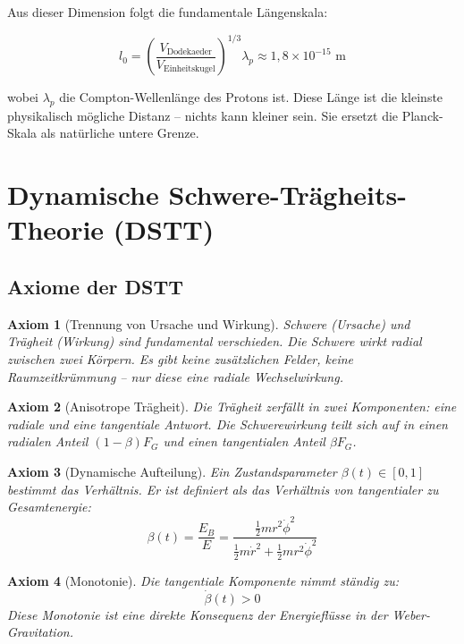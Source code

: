 \documentclass[12pt,a4paper]{article}
\newtheorem{axiom}{Axiom}[section]
\begin{document}
Aus dieser Dimension folgt die fundamentale Längenskala:

\begin{equation}
l_0 = \left( \frac{V_{\text{Dodekaeder}}}{V_{\text{Einheitskugel}}} \right)^{1/3} \lambda_p \approx 1,8 \times 10^{-15} \text{ m}
\end{equation}

wobei $\lambda_p$ die Compton-Wellenlänge des Protons ist. Diese Länge ist die kleinste physikalisch mögliche Distanz -- nichts kann kleiner sein. Sie ersetzt die Planck-Skala als natürliche untere Grenze.

\section{Dynamische Schwere-Trägheits-Theorie (DSTT)}

\subsection{Axiome der DSTT}

\begin{axiom}[Trennung von Ursache und Wirkung]
Schwere (Ursache) und Trägheit (Wirkung) sind fundamental verschieden. Die Schwere wirkt radial zwischen zwei Körpern. Es gibt keine zusätzlichen Felder, keine Raumzeitkrümmung -- nur diese eine radiale Wechselwirkung.
\end{axiom}

\begin{axiom}[Anisotrope Trägheit]
Die Trägheit zerfällt in zwei Komponenten: eine radiale und eine tangentiale Antwort. Die Schwerewirkung teilt sich auf in einen radialen Anteil $(1-\beta)F_G$ und einen tangentialen Anteil $\beta F_G$.
\end{axiom}

\begin{axiom}[Dynamische Aufteilung]
Ein Zustandsparameter $\beta(t) \in [0,1]$ bestimmt das Verhältnis. Er ist definiert als das Verhältnis von tangentialer zu Gesamtenergie:
\begin{equation}
\beta(t) = \frac{E_B}{E} = \frac{\frac{1}{2}mr^2\dot{\phi}^2}{\frac{1}{2}m\dot{r}^2 + \frac{1}{2}mr^2\dot{\phi}^2}
\end{equation}
\end{axiom}

\begin{axiom}[Monotonie]
Die tangentiale Komponente nimmt ständig zu:
\begin{equation}
\dot{\beta}(t) > 0
\end{equation}
Diese Monotonie ist eine direkte Konsequenz der Energieflüsse in der Weber-Gravitation.
\end{axiom}
\end{document}
